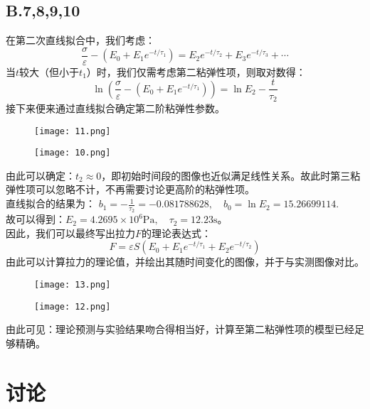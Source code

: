 \documentclass{ctexart}
\begin{document}
\subsection*{B.7,8,9,10}
在第二次直线拟合中，我们考虑：
\begin{equation}
  \frac{\sigma}{\varepsilon}-(E_0+E_1e^{-t/\tau_1})=E_2e^{-t/\tau_2}+E_3e^{-t/\tau_3}+\cdots
\end{equation}
当$t$较大（但小于$t_1$）时，我们仅需考虑第二粘弹性项，则取对数得：
\begin{equation}
  \ln\left(\frac{\sigma}{\varepsilon}-(E_0+E_1e^{-t/\tau_1})\right)=\ln E_2-\frac{t}{\tau_2}
\end{equation}
接下来便来通过直线拟合确定第二阶粘弹性参数。
\begin{figure}[htbp]
  \centering
  \texttt{[image: 11.png]}
\end{figure}
\begin{figure}[htbp]
  \centering
  \texttt{[image: 10.png]}
\end{figure}

\noindent 由此可以确定：$t_2\approx 0$，即初始时间段的图像也近似满足线性关系。故此时第三粘弹性项可以忽略不计，不再需要讨论更高阶的粘弹性项。\\
\noindent 直线拟合的结果为：
 $b_1=-\frac{1}{\tau_2}=-0.081788628 ,\quad b_0=\ln{E_2}=15.26699114.$\\
故可以得到：$E_2=4.2695\times10^6\mathrm{Pa},\quad \tau_2=12.23\mathrm{s}$。\\

因此，我们可以最终写出拉力$F$的理论表达式：
\begin{equation}
  F=\varepsilon S(E_0+E_1e^{-t/\tau_1}+E_2e^{-t/\tau_2})
\end{equation}
由此可以计算拉力的理论值，并绘出其随时间变化的图像，并于与实测图像对比。
\begin{figure}[htbp]
  \centering
  \texttt{[image: 13.png]}
\end{figure}
\begin{figure}[htbp]
  \centering
  \texttt{[image: 12.png]}
\end{figure}

由此可见：理论预测与实验结果吻合得相当好，计算至第二粘弹性项的模型已经足够精确。
\clearpage
\section{讨论}
\end{document}
